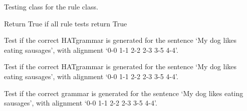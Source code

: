 \documentclass[letterpaper,10pt,english]{sphinxmanual}
\begin{document}
\label{tests:module-tests_rule}

\begin{fulllineitems}
\label{tests:tests_rule.RuleTests}
Testing class for the rule class.

\begin{fulllineitems}
\label{tests:tests_rule.RuleTests.rules_test_all}
Return True if all rule tests return True

\end{fulllineitems}


\begin{fulllineitems}
\label{tests:tests_rule.RuleTests.test2}
\end{fulllineitems}


\begin{fulllineitems}
\label{tests:tests_rule.RuleTests.test_hatrules}
Test if the correct HATgrammar is generated for
the sentence `My dog likes eating sausages',
with alignment `0-0 1-1 2-2 2-3 3-5 4-4'.

\end{fulllineitems}


\begin{fulllineitems}
\label{tests:tests_rule.RuleTests.test_hatrules2}
Test if the correct HATgrammar is generated for
the sentence `My dog likes eating sausages',
with alignment `0-0 1-1 2-2 2-3 3-5 4-4'.

\end{fulllineitems}


\begin{fulllineitems}
\label{tests:tests_rule.RuleTests.test_rules}
Test if the correct grammar is generated for
the sentence `My dog likes eating sausages',
with alignment `0-0 1-1 2-2 2-3 3-5 4-4'.

\end{fulllineitems}


\end{fulllineitems}
\end{document}
